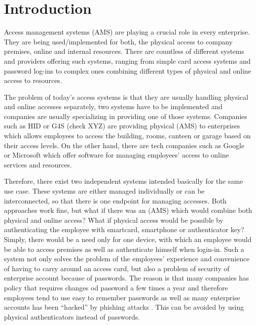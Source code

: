 \section{Introduction}
% 
Access management systems (AMS) are playing a crucial role in every enterprise. They are being used/implemented for both, the physical access to company premises, online and internal resources. There are countless of different systems and providers offering such systems, ranging from simple card access systems and password log-ins to complex ones combining different types of physical and online access to resources. 

The problem of today’s access systems is that they are usually handling physical and online accesses separately, two systems have to be implemented and companies are usually specializing in providing one of those systems. Companies such as HID or G4S (check XYZ) are providing physical (AMS) to enterprises which allows employees to access the building, rooms, canteen or garage based on their access levels. On the other hand, there are tech companies such as Google or Microsoft which offer software for managing employees’ access to online services and resources.

Therefore, there exist two independent systems intended basically for the same use case. These systems are either managed individually or can be interconnected, so that there is one endpoint for managing accesses. Both approaches work fine, but what if there was an (AMS) which would combine both physical and online access? What if physical access would be possible by authenticating the employee with smartcard, smartphone or authenticator key? Simply, there would be a need only for one device, with which an employee would be able to access premises as well as authenticate himself when login-in. Such a system not only solves the problem of the employees’ experience and convenience of having to carry around an access card, but also a problem of security of enterprise account because of passwords. The reason is that many companies has policy that requires changes od password a few times a year and therefore employees tend to use easy to remember passwords  as well as many enterprise accounts has been “hacked” by phishing attacks . This can be avoided by using physical authenticators instead of passwords.

